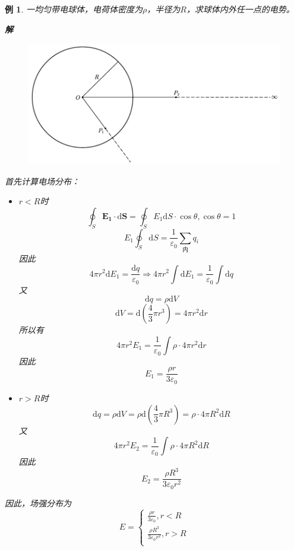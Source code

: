 \documentclass[12pt, a4paper, twoside]{ctexbook}
\newtheorem{example}[theorem]{例}
\begin{document}
\begin{example}
    一均匀带电球体，电荷体密度为$\rho$，半径为$R$，求球体内外任一点的电势。

    \noindent\textbf{解}
    \begin{figure}[H]
        \centerline{\includegraphics[scale=0.8]{CH09EX05.pdf}}
    \end{figure}
    {\sonti 首先计算电场分布}：
    \begin{itemize}
        \item $r<R$时
        $$
        \oint_S \boldsymbol{E_1}\cdot\mathrm{d}\boldsymbol{S}=\oint_S E_1\mathrm{d}S\cdot\cos\theta,\cos\theta=1
        $$
        $$
        E_1\oint_S\mathrm{d}S=\frac{1}{\varepsilon_0}\sum_{\text{内}}q_i
        $$
        因此
        $$
        4\pi r^2\mathrm{d}E_1=\frac{\mathrm{d}q}{\varepsilon_0} \Rightarrow 4\pi r^2\int\mathrm{d}E_1=\frac{1}{\varepsilon_0}\int\mathrm{d}q
        $$
        又
        $$
        \mathrm{d}q=\rho\mathrm{d}V
        $$
        $$
        \mathrm{d}V=\mathrm{d}\left(\frac{4}{3}\pi r^3\right)=4\pi r^2\mathrm{d}r
        $$
        所以有
        $$
        4\pi r^2E_1=\frac{1}{\varepsilon_0}\int\rho\cdot4\pi r^2\mathrm{d}r
        $$
        因此
        $$
        E_1=\frac{\rho r}{3\varepsilon_0}
        $$
        \item $r>R$时
        $$
        \mathrm{d}q=\rho\mathrm{d}V=\rho\mathrm{d}\left(\frac{4}{3}\pi R^3\right)=\rho\cdot4\pi R^2\mathrm{d}R
        $$
        又
        $$
        4\pi r^2E_2=\frac{1}{\varepsilon_0}\int\rho\cdot4\pi R^2\mathrm{d}R
        $$
        因此
        $$
        E_2=\frac{\rho R^3}{3\varepsilon_0r^2}
        $$
    \end{itemize}
    
    因此，场强分布为
    $$
    E=\left\{ \begin{array}{l}
        \frac{\rho r}{3\varepsilon_0},r<R\\
        \frac{\rho R^3}{3\varepsilon_0r^2},r>R\\
    \end{array} \right. 
    $$


\end{example}
\end{document}
